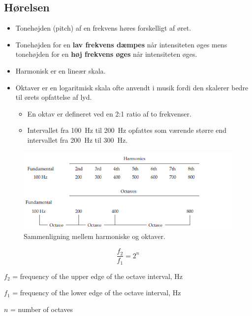\subsection{Hørelsen}
\begin{itemize}
	\item Tonehøjden (pitch) af en frekvens høres forskelligt af øret.
	\item Tonehøjden for en \textbf{lav frekvens dæmpes} når intensiteten øges mens tonehøjden for en \textbf{høj frekvens øges} når intensiteten øges.
	\item Harmonisk er en lineær skala.
	\item Oktaver er en logaritmisk skala ofte anvendt i musik fordi den skalerer bedre til ørets opfattelse af lyd. 
	\begin{itemize}
		\item En oktav er defineret ved en 2:1 ratio af to frekvenser. 
		\item Intervallet fra \SI{100}{\hertz} til \SI{200}{\hertz} opfattes som værende større end intervallet fra \SI{200}{\hertz} til \SI{300}{\hertz}. 
	\end{itemize}
\end{itemize}

\begin{figure} [H]
	\centering
	\includegraphics[width=\linewidth]{graphics/3.png}
	\caption{Sammenligning mellem harmoniske og oktaver. }
	\label{fig:3}
\end{figure}

\begin{equation}\label{eq:octave}
\frac{f_2}{f_1} = 2^n
\end{equation}

\begin{description}
	\item $f_2$ = frequency of the upper edge of the octave interval, \si{\hertz}
	\item $f_1$ = frequency of the lower edge of the octave interval, \si{\hertz}
	\item $n$ = number of octaves
\end{description}

